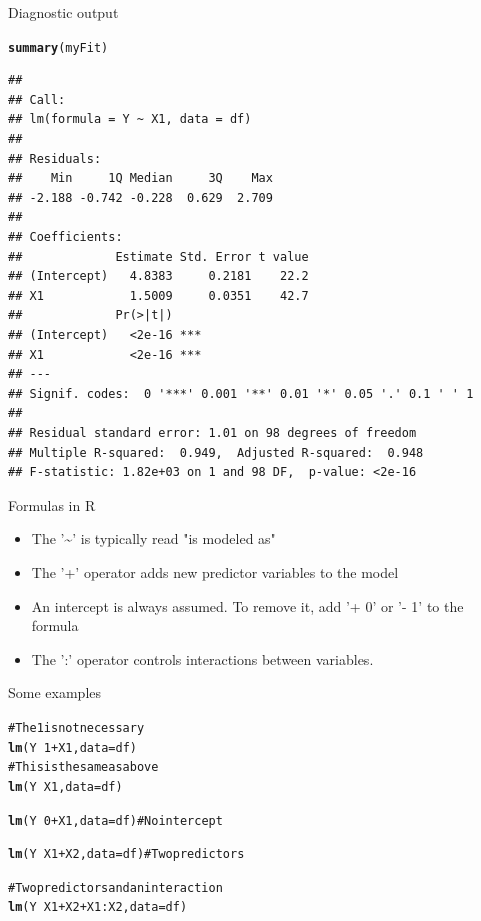 \documentclass[xcolor=dvipsnames]{beamer}\usepackage{graphicx, color}
\makeatletter
\newcommand{\hlfunctioncall}[1]{\textcolor[rgb]{0.501960784313725,0,0.329411764705882}{\textbf{#1}}}%
\newcommand{\hlcomment}[1]{\textcolor[rgb]{0.180392156862745,0.6,0.341176470588235}{#1}}%
\newenvironment{kframe}{%
 \def\at@end@of@kframe{}%
 \ifinner\ifhmode%
  \def\at@end@of@kframe{\end{minipage}}%
  \begin{minipage}{\columnwidth}%
 \fi\fi%
 \def\FrameCommand##1{\hskip\@totalleftmargin \hskip-\fboxsep
 \colorbox{shadecolor}{##1}\hskip-\fboxsep
     \hskip-\linewidth \hskip-\@totalleftmargin \hskip\columnwidth}%
 \MakeFramed {\advance\hsize-\width
   \@totalleftmargin\z@ \linewidth\hsize
   \@setminipage}}%
 {\par\unskip\endMakeFramed%
 \at@end@of@kframe}
\newenvironment{knitrout}{}{} %
\makeatother
\begin{document}
\begin{frame}[fragile]{Diagnostic output}
\begin{knitrout}
\color{fgcolor}\begin{kframe}
\begin{alltt}
\hlfunctioncall{summary}(myFit)
\end{alltt}
\begin{verbatim}
## 
## Call:
## lm(formula = Y ~ X1, data = df)
## 
## Residuals:
##    Min     1Q Median     3Q    Max 
## -2.188 -0.742 -0.228  0.629  2.709 
## 
## Coefficients:
##             Estimate Std. Error t value
## (Intercept)   4.8383     0.2181    22.2
## X1            1.5009     0.0351    42.7
##             Pr(>|t|)    
## (Intercept)   <2e-16 ***
## X1            <2e-16 ***
## ---
## Signif. codes:  0 '***' 0.001 '**' 0.01 '*' 0.05 '.' 0.1 ' ' 1
## 
## Residual standard error: 1.01 on 98 degrees of freedom
## Multiple R-squared:  0.949,	Adjusted R-squared:  0.948 
## F-statistic: 1.82e+03 on 1 and 98 DF,  p-value: <2e-16
\end{verbatim}
\end{kframe}
\end{knitrout}

\end{frame}

\begin{frame}{Formulas in R}
  \begin{itemize}
    \item The '\textasciitilde' is typically read "is modeled as"
    \item The '+' operator adds new predictor variables to the model
    \item An intercept is always assumed. To remove it, add '+ 0' or '- 1' to the formula
    \item The ':' operator controls interactions between variables.
  \end{itemize}
\end{frame}

\begin{frame}[fragile]{Some examples}
\begin{knitrout}
\color{fgcolor}\begin{kframe}
\begin{alltt}
\hlcomment{# The 1 is not necessary}
\hlfunctioncall{lm}(Y ~ 1 + X1, data = df)
\hlcomment{# This is the same as above}
\hlfunctioncall{lm}(Y ~ X1, data = df)

\hlfunctioncall{lm}(Y ~ 0 + X1, data = df)  \hlcomment{#No intercept}

\hlfunctioncall{lm}(Y ~ X1 + X2, data = df)  \hlcomment{#Two predictors}

\hlcomment{# Two predictors and an interaction}
\hlfunctioncall{lm}(Y ~ X1 + X2 + X1:X2, data = df)
\end{alltt}
\end{kframe}
\end{knitrout}

\end{frame}
\end{document}
